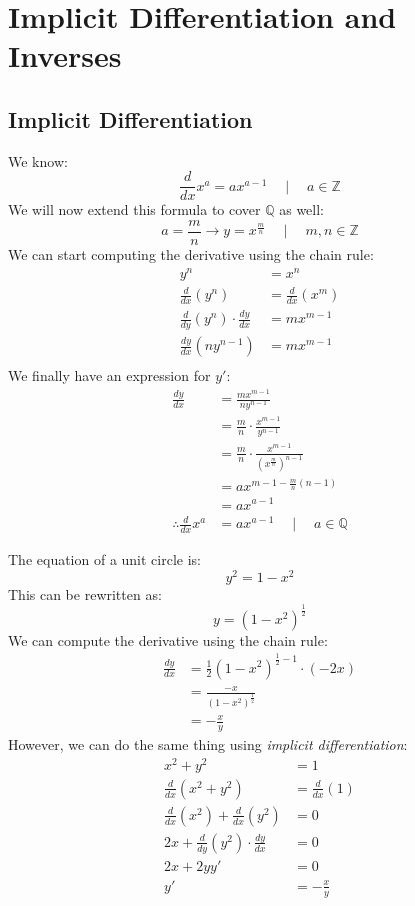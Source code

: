 \documentclass[../main.tex]{subfiles}
\begin{document}
\chapter{Implicit Differentiation and Inverses}
\section{Implicit Differentiation}
We know:
\[ \frac{d}{dx} x^a = ax^{a-1} \quad \mid \quad a \in \mathbb{Z} \]
We will now extend this formula to cover $\mathbb{Q}$ as well:
\[
    a = \frac{m}{n} \rightarrow y = x^{\frac{m}{n}}
    \quad \mid \quad
    m, n \in \mathbb{Z}
\]
We can start computing the derivative using the chain rule:
\begin{align*}
    y^n &= x^n\\
    \frac{d}{dx} \left( y^n \right) &= \frac{d}{dx} \left( x^m \right)\\
    \frac{d}{dy} \left( y^n \right) \cdot \frac{dy}{dx} &= mx^{m - 1}\\
    \frac{dy}{dx} \left( ny^{n - 1} \right) &= mx^{m - 1}\\
\end{align*}
We finally have an expression for $y'$:
\begin{align*}
    \frac{dy}{dx} &= \frac{mx^{m - 1}}{ny^{n - 1}}\\
    &= \frac{m}{n} \cdot \frac{x^{m - 1}}{y^{n - 1}}\\
    &= \frac{m}{n} \cdot \frac{x^{m - 1}}{\left( x^{\frac{m}{n}} \right)^{n - 1}}\\
    &= ax^{m - 1 - \frac{m}{n}(n - 1)}\\
    &= ax^{a - 1}\\
    \therefore \frac{d}{dx} x^a &= ax^{a - 1} \quad \mid \quad a \in \mathbb{Q}
\end{align*}
\begin{exmp}
    The equation of a unit circle is:
    \[ y^2 = 1 - x^2 \]
    This can be rewritten as:
    \[ y = \left( 1 - x^2 \right)^{\frac{1}{2}} \]
    We can compute the derivative using the chain rule:
    \begin{align*}
        \frac{dy}{dx} &= \frac{1}{2} \left( 1 - x^2 \right)^{\frac{1}{2} - 1} \cdot (-2x)\\
        &= \frac{-x}{\left( 1 - x^2 \right)^{\frac{1}{2}}}\\
        &= - \frac{x}{y}
    \end{align*}
    However, we can do the same thing using \emph{implicit differentiation}:
    \begin{align*}
        x^2 + y^2 &= 1\\
        \frac{d}{dx} \left( x^2 + y^2 \right) &= \frac{d}{dx} (1)\\
        \frac{d}{dx} \left( x^2 \right) + \frac{d}{dx} \left( y^2 \right) &= 0\\
        2x + \frac{d}{dy} \left( y^2 \right) \cdot \frac{dy}{dx} &= 0\\
        2x + 2y y' &= 0\\
        y' &= - \frac{x}{y}
    \end{align*}
\end{exmp}
\end{document}
